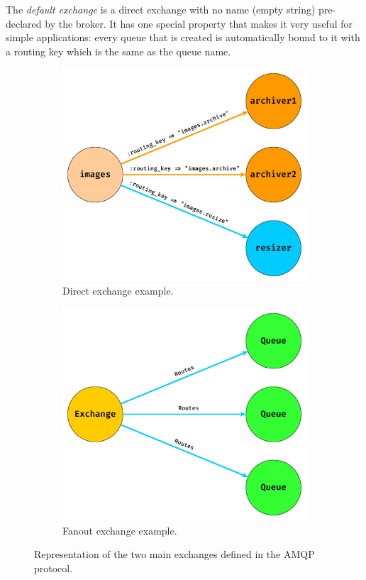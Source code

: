 The \emph{default exchange} is a direct exchange with no name (empty string) pre-declared by the broker. It has one special property that makes it
very useful for simple applications: every queue that is created is automatically bound to it with a routing key which is the same as the queue name.

\begin{figure}[ht]
	\centering
	\begin{subfigure}{.45\textwidth}
		\centering
		\includegraphics[width=\linewidth]{figures/direct-exchange.pdf}
		\caption{Direct exchange example.}
		\label{fig:direc-exchange}
	\end{subfigure}
	\begin{subfigure}{.45\textwidth}
		\centering
		\includegraphics[width=\linewidth]{figures/fanout-exchange.pdf}
		\caption{Fanout exchange example.}
		\label{fig:fanout-exchange}
	\end{subfigure}
	\caption{Representation of the two main exchanges defined in the AMQP protocol.}
	\label{fig:amqp-exhange-type}
\end{figure}

